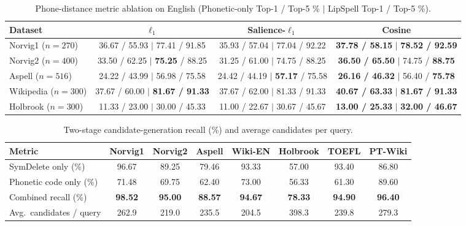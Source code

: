 \documentclass[
  journal=nlp,
  manuscript=research-article,
  year=2026,
]{cup-journal}
\begin{document}
\begin{table}[ht]
\centering
\scriptsize
\setlength{\tabcolsep}{3pt}
\caption{Phone-distance metric ablation on English (Phonetic-only Top-1 / Top-5 \% $\mid$ LipSpell Top-1 / Top-5 \%).}
\label{tab:ablation}
\begin{tabular}{lccc}
\toprule
Dataset & $\ell_1$ & Salience-$\ell_1$ & Cosine \\
\midrule
Norvig1 ($n=270$)   & 36.67 / 55.93 $\mid$ 77.41 / 91.85 & 35.93 / 57.04 $\mid$ 77.04 / 92.22 & \textbf{37.78 / 58.15} $\mid$ \textbf{78.52 / 92.59} \\
Norvig2 ($n=400$)   & 33.50 / 62.25 $\mid$ \textbf{75.25} / 88.25 & 31.25 / 61.00 $\mid$ 74.75 / 88.25 & \textbf{36.50 / 65.50} $\mid$ 74.75 / \textbf{88.75} \\
Aspell ($n=516$)    & 24.22 / 43.99 $\mid$ 56.98 / 75.58 & 24.42 / 44.19 $\mid$ \textbf{57.17} / 75.58 & \textbf{26.16 / 46.32} $\mid$ 56.40 / \textbf{75.78} \\
Wikipedia ($n=300$) & 37.67 / 60.00 $\mid$ \textbf{81.67 / 91.33} & 37.67 / 62.00 $\mid$ 81.33 / 91.33 & \textbf{40.67 / 63.33} $\mid$ \textbf{81.67 / 91.33} \\
Holbrook ($n=300$)  & 11.33 / 23.00 $\mid$ 30.00 / 45.33 & 11.00 / 22.67 $\mid$ 30.67 / 45.67 & \textbf{13.00 / 25.33} $\mid$ \textbf{32.00 / 46.67} \\
\bottomrule
\end{tabular}
\end{table}

\begin{table}[ht]
\centering
\small
\caption{Two-stage candidate-generation recall (\%) and average candidates per query.}
\label{tab:recall}
\begin{tabular}{lccccccc}
\toprule
Metric & Norvig1 & Norvig2 & Aspell & Wiki-EN & Holbrook & TOEFL & PT-Wiki \\
\midrule
SymDelete only (\%)       & 96.67 & 89.25 & 79.46 & 93.33 & 57.00 & 93.40 & 86.80 \\
Phonetic code only (\%)  & 71.48 & 69.75 & 62.40 & 73.00 & 56.33 & 61.30 & 89.60 \\
Combined recall (\%)      & \textbf{98.52} & \textbf{95.00} & \textbf{88.57} & \textbf{94.67} & \textbf{78.33} & \textbf{94.90} & \textbf{96.40} \\
Avg.\ candidates / query  & 262.9 & 219.0 & 235.5 & 204.5 & 398.3 & 239.8 & 279.3 \\
\bottomrule
\end{tabular}
\end{table}
\end{document}
